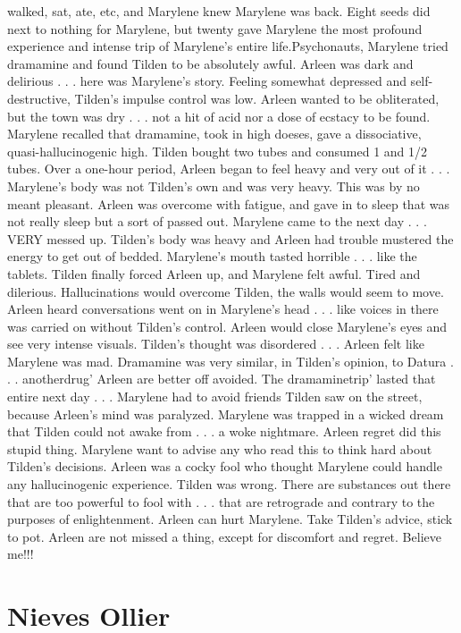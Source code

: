 \documentclass[12pt]{book}
\begin{document}
walked, sat, ate, etc, and Marylene knew Marylene was back. Eight seeds did next to nothing for Marylene, but twenty gave Marylene the most profound experience and intense trip of Marylene's entire life.Psychonauts, Marylene tried dramamine and found Tilden to be absolutely awful. Arleen was dark and delirious . . .  here was Marylene's story. Feeling somewhat depressed and self-destructive, Tilden's impulse control was low. Arleen wanted to be obliterated, but the town was dry . . .  not a hit of acid nor a dose of ecstacy to be found. Marylene recalled that dramamine, took in high doeses, gave a dissociative, quasi-hallucinogenic high. Tilden bought two tubes and consumed 1 and 1/2 tubes. Over a one-hour period, Arleen began to feel heavy and very out of it . . .  Marylene's body was not Tilden's own and was very heavy. This was by no meant pleasant. Arleen was overcome with fatigue, and gave in to sleep that was not really sleep but a sort of passed out. Marylene came to the next day . . .  VERY messed up. Tilden's body was heavy and Arleen had trouble mustered the energy to get out of bedded. Marylene's mouth tasted horrible . . .  like the tablets. Tilden finally forced Arleen up, and Marylene felt awful. Tired and dilerious. Hallucinations would overcome Tilden, the walls would seem to move. Arleen heard conversations went on in Marylene's head . . .  like voices in there was carried on without Tilden's control. Arleen would close Marylene's eyes and see very intense visuals. Tilden's thought was disordered . . .  Arleen felt like Marylene was mad. Dramamine was very similar, in Tilden's opinion, to Datura . . .  anotherdrug' Arleen are better off avoided. The dramaminetrip' lasted that entire next day . . .  Marylene had to avoid friends Tilden saw on the street, because Arleen's mind was paralyzed. Marylene was trapped in a wicked dream that Tilden could not awake from . . .  a woke nightmare. Arleen regret did this stupid thing. Marylene want to advise any who read this to think hard about Tilden's decisions. Arleen was a cocky fool who thought Marylene could handle any hallucinogenic experience. Tilden was wrong. There are substances out there that are too powerful to fool with . . .  that are retrograde and contrary to the purposes of enlightenment. Arleen can hurt Marylene. Take Tilden's advice, stick to pot. Arleen are not missed a thing, except for discomfort and regret. Believe me!!!



\chapter{Nieves Ollier}
\end{document}
